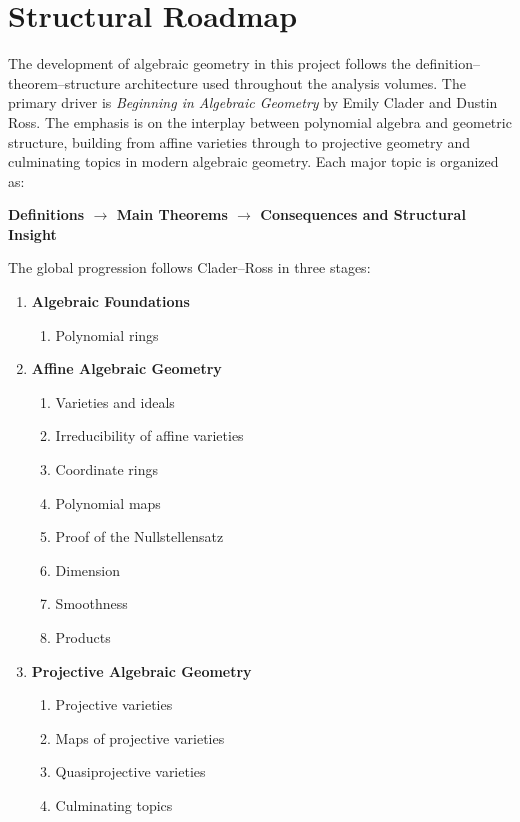 \section*{Structural Roadmap}
The development of algebraic geometry in this project follows
the definition--theorem--structure architecture used
throughout the analysis volumes.
The primary driver is \textit{Beginning in Algebraic Geometry}
by Emily Clader and Dustin Ross. The emphasis is on the interplay
between polynomial algebra and geometric structure,
building from affine varieties through to projective geometry
and culminating topics in modern algebraic geometry.
Each major topic is organized as:
\begin{center}
\textbf{Definitions $\longrightarrow$ Main Theorems $\longrightarrow$ Consequences and Structural Insight}
\end{center}
The global progression follows Clader--Ross in three stages:
\begin{enumerate}
  \item \textbf{Algebraic Foundations}
  \begin{enumerate}
    \item Polynomial rings
  \end{enumerate}
  \item \textbf{Affine Algebraic Geometry}
  \begin{enumerate}
    \item Varieties and ideals
    \item Irreducibility of affine varieties
    \item Coordinate rings
    \item Polynomial maps
    \item Proof of the Nullstellensatz
    \item Dimension
    \item Smoothness
    \item Products
  \end{enumerate}
  \item \textbf{Projective Algebraic Geometry}
  \begin{enumerate}
    \item Projective varieties
    \item Maps of projective varieties
    \item Quasiprojective varieties
    \item Culminating topics
  \end{enumerate}
\end{enumerate}
\vspace{1em}
